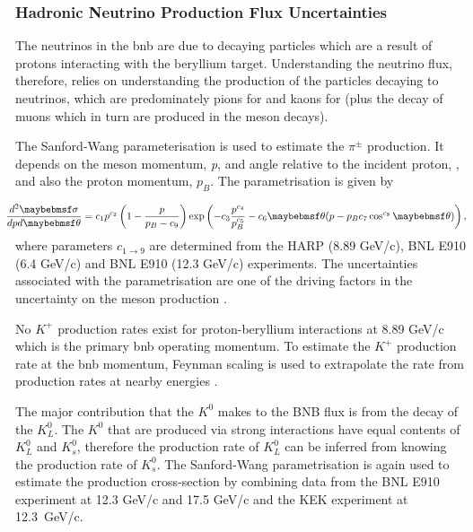 \newpage
\subsubsection*{Hadronic Neutrino Production Flux Uncertainties}
The neutrinos in the \gls{bnb} are due to decaying particles which are a result of protons interacting with the beryllium target. Understanding the neutrino flux, therefore, relies on understanding the production of the particles decaying to neutrinos, which are predominately pions for \numu and kaons for \nue (plus the decay of muons which in turn are produced in the meson decays). 

The Sanford-Wang parameterisation is used to estimate the $\pi^{\pm}$ production. It depends on the meson momentum, \textit{p}, and angle relative to the incident proton, \textit{\theta}, and also the proton momentum, $p_B$. The parametrisation is given by

\begin{equation}
  \hspace{-0.35cm}
  \label{eq:SW}
  \frac{d^{2}\sigma}{dpd\theta} = 
  c_{1}p^{c_{2}} 
  \left( 1 - \frac{p}{p_{B} -c_{9}} \right)
  \exp \left( -c_{3} \frac{p^{c_{4}}}{p_{B}^{c_{5}}} - c_{6}\theta(p - p_{B}c_{7}\cos^{c_{8}}{\theta}) \right),
\end{equation}
where parameters $c_{1 \rightarrow 9}$ are determined from the HARP (8.89 GeV/c), BNL E910 (6.4 GeV/c) and BNL E910 (12.3 GeV/c) experiments. The uncertainties associated with the parametrisation are one of the driving factors in the uncertainty on the meson production \cite{BNB_flux}.

No $K^+$ production rates exist for proton-beryllium interactions at 8.89 GeV/c which is the primary \gls{bnb} operating momentum. To estimate the $K^+$ production rate at the \gls{bnb} momentum, Feynman scaling is used to extrapolate the rate from production rates at nearby energies \cite{BNB_flux}.

The major contribution that the $K^0$ makes to the BNB flux is from the decay of the $K^0_L$. The $K^0$ that are produced via strong interactions have equal contents of $K^0_L$ and $K^0_s$, therefore the production rate of $K^0_L$ can be inferred from knowing the production rate of $K^0_s$. The Sanford-Wang parametrisation is again used to estimate the production cross-section by combining data from the BNL E910 experiment at 12.3 GeV/c and 17.5 GeV/c and the KEK experiment at \mbox{12.3 GeV/c}.

